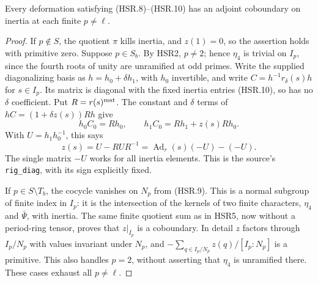 \begin{lemma}
\label{claim:HSR6}
Every deformation satisfying (HSR.8)--(HSR.10) has an adjoint
coboundary on inertia at each finite $p\ne\ell$.
\end{lemma}
\begin{proof}
If $p\notin S$, the quotient $\pi$ kills inertia, and
$z(1)=0$, so the assertion holds with primitive zero.
Suppose $p\in S_b$.  By HSR2, $p\ne2$; hence $\eta_4$ is
trivial on $I_p$, since the fourth roots of unity are unramified
at odd primes.  Write the supplied diagonalizing basis as
$h=h_0+\delta h_1$, with $h_0$ invertible, and write
$C=h^{-1}r_\delta(s)h$ for $s\in I_p$.  Its matrix is diagonal
with the fixed inertia entries (HSR.10), so has no $\delta$
coefficient.  Put $R=r(s)^{\rm mat}$.  The constant and
$\delta$ terms of $hC=(1+\delta z(s))Rh$ give
\[
 h_0C_0=Rh_0,\qquad
 h_1C_0=Rh_1+z(s)Rh_0.
\]
With $U=h_1h_0^{-1}$, this says
\[
 z(s)=U-RUR^{-1}
     =\operatorname{Ad}_r(s)(-U)-(-U).
 \tag{HSR.20}
\]
The single matrix $-U$ works for all inertia elements.  This is
the source's \texttt{rig\_diag}, with its sign explicitly fixed.

If $p\in S\setminus T_b$, the cocycle vanishes on $N_p$ from
(HSR.9).  This is a normal subgroup of finite index in $I_p$:
it is the intersection of the kernels of two finite characters,
$\eta_4$ and $\bar\Psi$, with inertia.  The same finite quotient
sum as in HSR5, now without a period-ring tensor, proves that
$z|_{I_p}$ is a coboundary.  In detail $z$ factors through
$I_p/N_p$ with values invariant under $N_p$, and
$-\sum_{q\in I_p/N_p}z(q)/[I_p:N_p]$ is a primitive.  This
also handles $p=2$, without asserting that $\eta_4$ is
unramified there.  These cases exhaust all $p\ne\ell$.
\end{proof}

